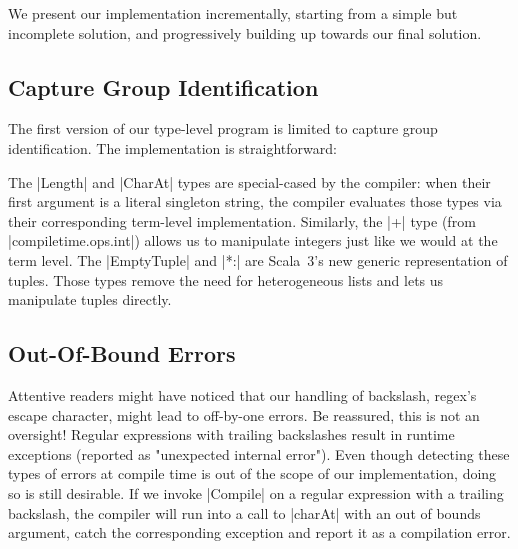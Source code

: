 We present our implementation incrementally, starting from a simple but incomplete solution, and progressively building up towards our final solution.

\subsection{Capture Group Identification}

The first version of our type-level program is limited to capture group identification.
The implementation is straightforward:

\regexFirstIteration
%
%

\noindent
The |Length| and |CharAt| types are special-cased by the compiler: when their first argument is a literal singleton string, the compiler evaluates those types via their corresponding term-level implementation.
Similarly, the |+| type (from |compiletime.ops.int|) allows us to manipulate integers just like we would at the term level.
The |EmptyTuple| and |*:| are Scala~3's new generic representation of tuples.
Those types remove the need for heterogeneous lists and lets us manipulate tuples directly.

\subsection{Out-Of-Bound Errors}

Attentive readers might have noticed that our handling of backslash, regex's escape character, might lead to off-by-one errors.
Be reassured, this is not an oversight!
Regular expressions with trailing backslashes result in runtime exceptions (reported as "unexpected internal error").
Even though detecting these types of errors at compile time is out of the scope of our implementation, doing so is still desirable.
If we invoke |Compile| on a regular expression with a trailing backslash, the compiler will run into a call to |charAt| with an out of bounds argument, catch the corresponding exception and report it as a compilation error.


